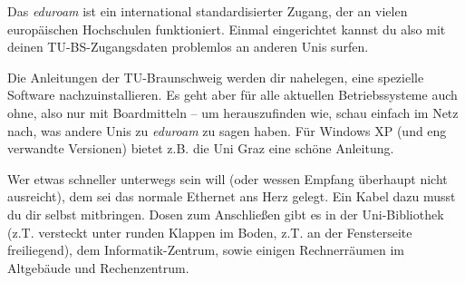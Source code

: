 		Das \emph{eduroam} ist ein international standardisierter Zugang, der an vielen europäischen Hochschulen funktioniert. Einmal eingerichtet kannst du also mit deinen TU-BS-Zugangsdaten problemlos an anderen Unis surfen.

		Die Anleitungen der TU-Braunschweig werden dir nahelegen, eine spezielle Software nachzuinstallieren. Es geht aber für alle aktuellen Betriebssysteme auch ohne, also nur mit Boardmitteln -- um herauszufinden wie, schau einfach im Netz nach, was andere Unis zu \emph{eduroam} zu sagen haben. Für Windows XP (und eng verwandte Versionen) bietet z.B. die Uni Graz eine schöne Anleitung.

		Wer etwas schneller unterwegs sein will (oder wessen Empfang überhaupt nicht ausreicht), dem sei das normale Ethernet ans Herz gelegt. Ein Kabel dazu musst du dir selbst mitbringen. Dosen zum Anschließen gibt es in der Uni-Bibliothek (z.T. versteckt unter runden Klappen im Boden, z.T. an der Fensterseite freiliegend), dem Informatik-Zentrum, sowie einigen Rechnerräumen im Altgebäude und Rechenzentrum.
